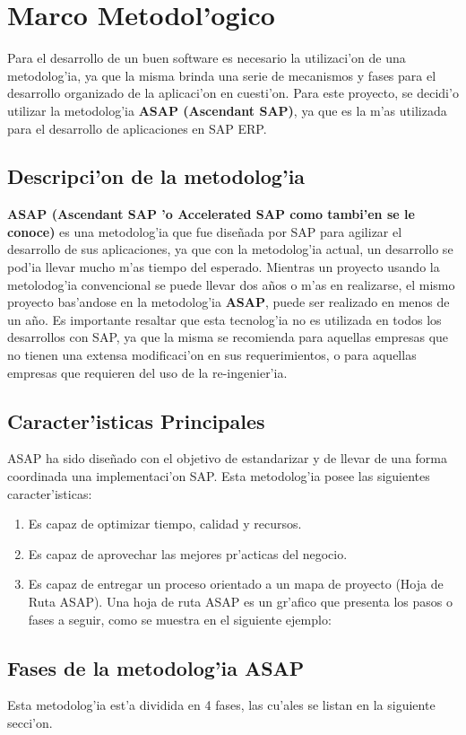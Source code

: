 \chapter{Marco Metodol'ogico} \label{chap:metodologia}
Para el desarrollo de un buen software es necesario la utilizaci'on de una metodolog'ia, ya que la misma brinda una serie de mecanismos y fases para el desarrollo organizado de la aplicaci'on en cuesti'on.
Para este proyecto, se decidi'o utilizar la metodolog'ia \textbf{ASAP (Ascendant SAP)}, ya que es la m'as utilizada para el desarrollo de aplicaciones en SAP ERP.
\section{Descripci'on de la metodolog'ia}
\textbf{ASAP (Ascendant SAP 'o Accelerated SAP como tambi'en se le conoce)} es una metodolog'ia que fue dise\~nada por SAP para agilizar el desarrollo de sus aplicaciones, ya que con la metodolog'ia actual, un desarrollo se pod'ia llevar mucho m'as tiempo del esperado. Mientras un proyecto usando la metolodog'ia convencional se puede llevar dos a\~nos o m'as en realizarse, el mismo proyecto bas'andose en la metodolog'ia \textbf{ASAP}, puede ser realizado en menos de un a\~no. 
Es importante resaltar que esta tecnolog'ia no es utilizada en todos los desarrollos con SAP, ya que la misma se recomienda para aquellas empresas que no tienen una extensa modificaci'on en sus requerimientos, o para aquellas empresas que requieren del uso de la re-ingenier'ia.
\section{Caracter'isticas Principales}
ASAP ha sido dise\~nado con el objetivo de estandarizar y de llevar de una forma coordinada una implementaci'on SAP.  Esta metodolog'ia posee las siguientes caracter'isticas:
\begin{enumerate}
\item Es capaz de optimizar tiempo, calidad y recursos.
\item Es capaz de aprovechar las mejores pr'acticas del negocio.
\item Es capaz de entregar un proceso orientado a un mapa de proyecto (Hoja de Ruta ASAP). Una hoja de ruta ASAP es un gr'afico que presenta los pasos o fases a seguir, como se muestra en el siguiente ejemplo: 

\end{enumerate}

\section{Fases de la metodolog'ia ASAP}
Esta metodolog'ia est'a dividida en 4 fases, las cu'ales se listan en la siguiente secci'on.
